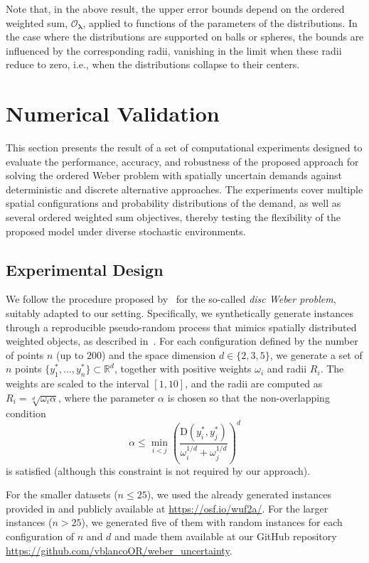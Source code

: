 \documentclass[letter,11pt, reqno]{amsart}
\newcommand{\D}{\mathrm{D}}
\renewcommand{\O}{\mathcal{O}}
\renewcommand{\;}{\quad}
\theoremstyle{thmstyleone}%
\theoremstyle{thmstyletwo}%
\theoremstyle{thmstylethree}%
\begin{document}
Note that, in the above result, the upper error bounds depend on the ordered weighted sum, $\O_{\bm \lambda}$, applied to functions of the parameters of the distributions. 
In the case where the distributions are supported on balls or spheres, the bounds are influenced by the corresponding radii, 
vanishing in the limit when these radii reduce to zero, i.e., when the distributions collapse to their centers.

\section{Numerical Validation}\label{sec:comp}

This section presents the result of a set of computational experiments designed to evaluate the performance, accuracy, and robustness of the proposed approach for solving the ordered Weber problem with spatially uncertain demands against deterministic and discrete alternative approaches. The experiments cover multiple spatial configurations and probability distributions of the demand, as well as several ordered weighted sum objectives, thereby testing the flexibility of the proposed model under diverse stochastic environments. 



\subsection*{Experimental Design}

We follow the procedure proposed by~\cite{kalczynski2025weber} for the so-called \emph{disc Weber problem}, suitably adapted to our setting. Specifically, we synthetically generate instances through a reproducible pseudo-random process that mimics spatially distributed weighted objects, as described in~\cite{drezner2024dispersed}. For each configuration defined by the number of points $n$ (up to $200$) and the space dimension $d \in \{2,3,5\}$, we generate a set of $n$ points $\{y^*_1,\ldots, y^*_n\} \subset \mathbb{R}^d$, together with positive weights $\omega_i$ and radii $R_i$. The weights are scaled to the interval $[1,10]$, and the radii are computed as $
R_i = \sqrt[d]{\omega_i \alpha}$, 
where the parameter $\alpha$ is chosen so that the non-overlapping condition
\[
\alpha \leq \min_{i<j} \left( \frac{\D(y^*_i,y^*_j)}{\omega_i^{1/d}+\omega_j^{1/d}} \right)^d
\]
is satisfied (although this constraint is not required by our approach).

For the smaller datasets ($n\leq 25$), we used the already generated instances provided in \cite{kalczynski2025weber} and publicly available at \url{https://osf.io/wuf2a/}. For the larger instances ($n>25$), we generated five of them with random instances for each configuration of $n$ and $d$ and made them available at our GitHub repository \url{https://github.com/vblancoOR/weber_uncertainty}.
\end{document}
